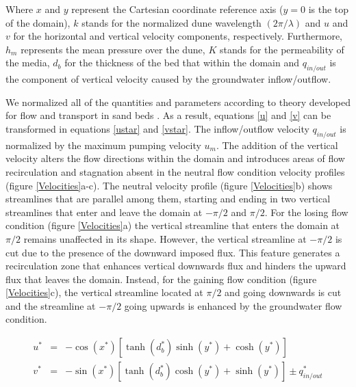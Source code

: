 \documentclass[draft,linenumbers]{agujournal2018}
\begin{document}
Where $x$ and $y$ represent the Cartesian coordinate reference axis ($y = 0$ is the top of the domain), $k$ stands for the normalized dune wavelength $(2 \pi / \lambda)$ and $u$ and $v$ for the horizontal and vertical velocity components, respectively. Furthermore, $h_m$ represents the mean pressure over the dune, $K$ stands for the permeability of the media, $d_b$ for the thickness of the bed that within the domain and $q_{in/out}$ is the component of vertical velocity caused by the groundwater inflow/outflow.

We normalized all of the quantities and parameters according to theory developed for flow and transport in sand beds \citep{Elliott1997,Packman2000}. As a result, equations \ref{u} and \ref{v} can be transformed in equations \ref{ustar} and \ref{vstar}. The inflow/outflow velocity $q_{in/out}$ is normalized by the maximum pumping velocity $u_m$. The addition of the vertical velocity alters the flow directions within the domain and introduces areas of flow recirculation and stagnation absent in the neutral flow condition velocity profiles (figure \ref{Velocities}a-c). The neutral velocity profile (figure \ref{Velocities}b) shows streamlines that are parallel among them, starting and ending in two vertical streamlines that enter and leave the domain at $-\pi/2$ and $\pi/2$. For the losing flow condition (figure \ref{Velocities}a) the vertical streamline that enters the domain at $\pi/2$ remains unaffected in its shape. However, the vertical streamline at $-\pi/2$ is cut due to the presence of the downward imposed flux. This feature generates a recirculation zone that enhances vertical downwards flux and hinders the upward flux that leaves the domain. Instead, for the gaining flow condition (figure \ref{Velocities}c), the vertical streamline located at $\pi/2$ and going downwards is cut and the streamline at $-\pi/2$ going upwards is enhanced by the groundwater flow condition.


\begin{eqnarray}
\label{ustar}
  u^* & = & -\cos(x^*)[\tanh(d_b^*)\sinh(y^*) + \cosh(y^*)]\\
\label{vstar}
  v^* & = & -\sin(x^*)[\tanh(d_b^*)\cosh(y^*) + \sinh(y^*)] \pm q_{in/out}^*
\end{eqnarray}
\end{document}
